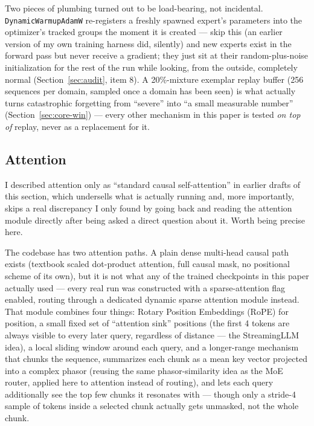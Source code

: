 \documentclass[11pt,letterpaper]{article}
\begin{document}
Two pieces of plumbing turned out to be load-bearing, not incidental. \texttt{DynamicWarmupAdamW} re-registers a freshly spawned expert's parameters into the optimizer's tracked groups the moment it is created --- skip this (an earlier version of my own training harness did, silently) and new experts exist in the forward pass but never receive a gradient; they just sit at their random-plus-noise initialization for the rest of the run while looking, from the outside, completely normal (Section~\ref{sec:audit}, item 8). A 20\%-mixture exemplar replay buffer (256 sequences per domain, sampled once a domain has been seen) is what actually turns catastrophic forgetting from ``severe'' into ``a small measurable number'' (Section~\ref{sec:core-win}) --- every other mechanism in this paper is tested \emph{on top of} replay, never as a replacement for it.

\subsection{Attention}
\label{sec:attention}

I described attention only as ``standard causal self-attention'' in earlier drafts of this section, which undersells what is actually running and, more importantly, skips a real discrepancy I only found by going back and reading the attention module directly after being asked a direct question about it. Worth being precise here.

The codebase has two attention paths. A plain dense multi-head causal path exists (textbook scaled dot-product attention, full causal mask, no positional scheme of its own), but it is not what any of the trained checkpoints in this paper actually used --- every real run was constructed with a sparse-attention flag enabled, routing through a dedicated dynamic sparse attention module instead. That module combines four things: Rotary Position Embeddings (RoPE) for position, a small fixed set of ``attention sink'' positions (the first 4 tokens are always visible to every later query, regardless of distance --- the StreamingLLM idea), a local sliding window around each query, and a longer-range mechanism that chunks the sequence, summarizes each chunk as a mean key vector projected into a complex phasor (reusing the same phasor-similarity idea as the MoE router, applied here to attention instead of routing), and lets each query additionally see the top few chunks it resonates with --- though only a stride-4 sample of tokens inside a selected chunk actually gets unmasked, not the whole chunk.
\end{document}
